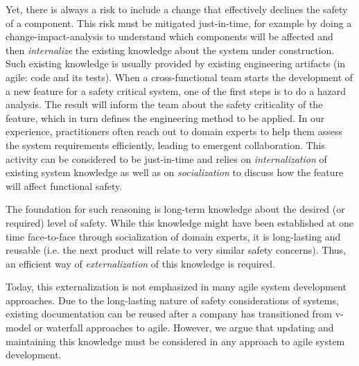 Yet, there is always a risk to include a change %
that effectively declines the safety of a component.
This risk must be mitigated just-in-time, for example by doing a change-impact-analysis to understand which components will be affected and then \emph{internalize} the existing knowledge about the system under construction.
Such existing knowledge is usually provided by existing engineering artifacts (in agile: code and its tests).
When a cross-functional team starts the development of a new feature for a safety critical system, one of the first steps is to do a hazard analysis. 
The result will inform the team about the safety criticality of the feature, which in turn defines the engineering method to be applied. 
In our experience, practitioners often reach out to domain experts to help them assess the system requirements efficiently, leading to emergent collaboration.
This activity can be considered to be just-in-time and relies on \emph{internalization} of existing system knowledge as well as on \emph{socialization} to discuss how the feature will affect functional safety.%

The foundation for such reasoning is long-term knowledge about the desired (or required) level of safety. 
While this knowledge might have been established at one time face-to-face through socialization of domain experts, it is long-lasting and reusable (i.e. the next product will relate to very similar safety concerns). 
Thus, an efficient way of \emph{externalization} of this knowledge is required. 

Today, this externalization is not emphasized in many agile system development approaches.
Due to the long-lasting nature of safety considerations of systems, existing documentation can be reused after a company has transitioned from v-model or waterfall approaches to agile. 
However, we argue that updating and maintaining this knowledge must be considered in any approach to agile system development.